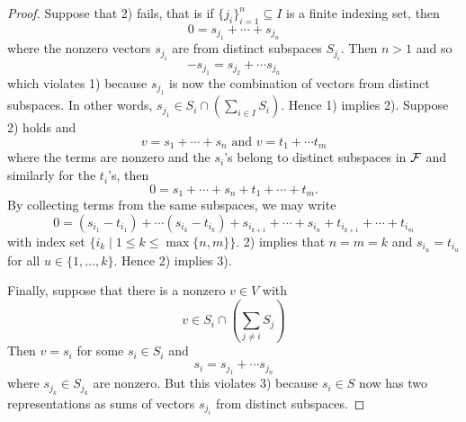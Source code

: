 \begin{proof}
Suppose that 2) fails, that is if $\{j_i\}_{i=1}^n\subseteq I$ is a finite indexing set, then
\[
	0 = s_{j_1} + \cdots + s_{j_n}
\]
where the nonzero vectors $s_{j_i}$ are from distinct subspaces $S_{j_i}$. Then $n>1$ and so
\[
	-s_{j_1} = s_{j_2} + \cdots s_{j_n}
\]
which violates 1) because $s_{j_1}$ is now the combination of vectors from distinct subspaces. In other words, $s_{j_1}\in S_i\cap \left(\sum_{i\in I} S_i\right)$. Hence 1) implies 2). Suppose 2) holds and
\[
	v = s_1 + \cdots + s_n \text{ and } v = t_1 + \cdots t_m
\]
where the terms are nonzero and the $s_i$'s belong to distinct subspaces in ${\mathcal{F}}$ and similarly for the $t_i$'s, then 
\[
	0 = s_1 + \cdots + s_n + t_1 + \cdots + t_m.
\]
By collecting terms from the same subspaces, we may write
\[
	0 = (s_{i_1} - t_{i_1}) + \cdots (s_{i_k} - t_{i_k}) + s_{i_{k+1}} + \cdots + s_{i_n} + t_{i_{k+1}} + \cdots + t_{i_m}
\]
with index set $\{i_k\mid 1\leq k\leq\max\{n,m\}\}$. 2) implies that $n = m = k$ and $s_{i_u} = t_{i_u}$ for all $u\in\{1,\ldots,k\}$. Hence 2) implies 3).

Finally, suppose that there is a nonzero $v\in V$ with
\[
	v\in S_i\cap\left(\sum_{j\neq i} S_j\right)
\]
Then $v=s_i$ for some $s_i\in S_i$ and
\[
	s_i = s_{j_1} + \cdots s_{j_n}
\]
where $s_{j_k}\in S_{j_k}$ are nonzero. But this violates 3) because $s_i\in S$ now has two representations as sums of vectors $s_{j_i}$ from distinct subspaces.

\end{proof}

